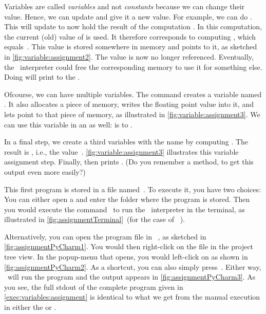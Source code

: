 %
Variables are called \emph{variables} and not \emph{constants} because we can change their value.
Hence, we can update  and give it a new value.
For example, we can do .
This will update  to now hold the result of the computation .
In this computation, the current (old) value of  is used.
It therefore corresponds to computing , which equals~.
This value is stored somewhere in memory and  points to it, as sketched in \cref{fig:variable:assignment2}.
The value  is now no longer referenced.
Eventually, the \python\ interpreter could free the corresponding memory to use it for something else.
Doing  will print  to the .

Ofcourse, we can have multiple variables.
The command  creates a variable named .
It also allocates a piece of memory, writes the floating point value  into it, and lets  point to that piece of memory, as illustrated in \cref{fig:variable:assignment3}.
We can use this variable in an  as well:
 is  to .%
%
\begin{sloppypar}%
In a final step, we create a third variables with the name  by computing .
The result is , i.e., the  value~.
\cref{fig:variable:assignment3} illustrates this variable assignment step.
Finally,  then prints .
(Do you remember a method, to get this output even more easily?)%
\end{sloppypar}%
%
This first program is stored in a file named~.
To execute it, you have two choices:
You can either open a  and enter the folder where the program is stored.
Then you would execute the command~ to run the \python\ interpreter in the terminal, as illustrated in \cref{fig:assignmentTerminal}~(for the case of \ubuntu\ \linux).

Alternatively, you can open the program file in \pycharm\ , as sketched in \cref{fig:assignmentPyCharm1}.
You would then right-click on the file  in the project tree view.
In the popup-menu that opens, you would left-click on  as shown in \cref{fig:assignmentPyCharm2}.
As a shortcut, you can also simply press~.
Either way, \pycharm\ will run the program and the output appears in \cref{fig:assignmentPyCharm3}.
As you see, the full \acrfull{stdout} of the complete program given in \cref{exec:variables:assignment} is identical to what we get from the manual execution in either the  or \pycharm.

